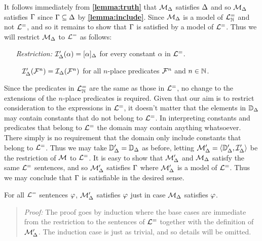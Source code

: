 It follows immediately from \textbf{\ref{lemma:truth}} that $\mathcal{M}_{\Delta}$ satisfies $\Delta$ and so $\mathcal{M}_{\Delta}$ satisfies $\Gamma$ since $\Gamma\subseteq\Delta$ by \textbf{\ref{lemma:include}}. 
Since $\mathcal{M}_{\Delta}$ is a model of $\mathcal{L}^{=}_{\mathbb{N}}$ and not $\mathcal{L}^{=}$, and so it remains to show that $\Gamma$ is satisfied by a model of $\mathcal{L}^{=}$.
Thus we will restrict $\mathcal{M}_{\Delta}$ to $\mathcal{L}^{=}$ as follows: 
  \begin{enumerate}[leftmargin=1.5in]
    \item[\it Restriction:] $\mathcal{I}'_{\Delta}(\alpha)=[\alpha]_{\Delta}$ for every constant $\alpha$ in $\mathcal{L}^{=}$.
    \item[~] $\mathcal{I}'_{\Delta}(\mathcal{F}^n)=\mathcal{I}_{\Delta}(\mathcal{F}^n)$ for all $n$-place predicates $\mathcal{F}^n$ and $n\in\mathbb{N}$. 
  \end{enumerate}
Since the predicates in $\mathcal{L}^{=}_{\mathbb{N}}$ are the same as those in $\mathcal{L}^{=}$, no change to the extensions of the $n$-place predicates is required.
Given that our aim is to restrict consideration to the expressions in $\mathcal{L}^{=}$, it doesn't matter that the elements in $\mathbb{D}_{\Delta}$ may contain constants that do not belong to $\mathcal{L}^{=}$.
In interpreting constants and predicates that belong to $\mathcal{L}^{=}$ the domain may contain anything whatsoever.
There simply is no requirement that the domain only include constants that belong to $\mathcal{L}^{=}$.
Thus we may take $\mathbb{D}'_{\Delta}=\mathbb{D}_{\Delta}$ as before, letting $\mathcal{M}'_{\Delta}=\langle\mathbb{D}'_{\Delta},\mathcal{I}'_{\Delta}\rangle$ be the restriction of $\mathcal{M}$ to $\mathcal{L}^{=}$. 
It is easy to show that $\mathcal{M}'_{\Delta}$ and $\mathcal{M}_{\Delta}$ satisfy the same $\mathcal{L}^{=}$ sentences, and so $\mathcal{M}'_{\Delta}$ satisfies $\Gamma$ where $\mathcal{M}'_{\Delta}$ is a model of $\mathcal{L}^{=}$. 
Thus we may conclude that $\Gamma$ is satisfiable in the desired sense. 

\begin{Lthm} \label{lemma:satrest}
  For all $\mathcal{L}^{=}$ sentences $\varphi$, $\mathcal{M}'_{\Delta}$ satisfies $\varphi$ just in case $\mathcal{M}_{\Delta}$ satisfies $\varphi$.
\end{Lthm}

\begin{quote} 
  \textit{Proof:} The proof goes by induction where the base cases are immediate from the restriction to the sentences of $\mathcal{L}^{=}$ together with the definition of $\mathcal{M}'_{\Delta}$.
  The induction case is just as trivial, and so details will be omitted.
\end{quote}

